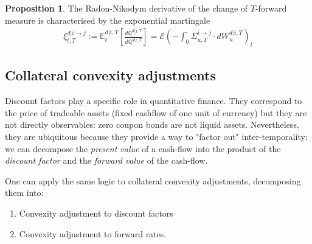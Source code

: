 \documentclass[11pt,english]{amsart}
\newcommand{\EE}{\mathbb{E}}
\newcommand{\QQ}{\mathbb{Q}}
\newcommand{\Q}{\Xi}
\theoremstyle{definition}
\newtheorem{prop}{Proposition}
\begin{document}
 
\begin{prop}
The Radon-Nikodym derivative of the change of $T$-forward measure is characterised by the exponential martingale 
\begin{eqnarray}
  \xi^{d|i\to j}_{t,T}  := \EE^{d|i,T}_t\left[ \frac{d\QQ^{d|j,T}}{d\QQ^{d|i,T}} \right] 
  = \mathcal{E}\left( - \int_0^\cdot \Sigma^{i\to j}_{u,T} \cdot dW^{d|i,T}_u \right)_t
  \label{eq:collateral_radon_nikodym}
\end{eqnarray}
\end{prop}



%

\subsection{Collateral convexity adjustments}
Discount factors play a specific role in quantitative finance. They correspond to the price of tradeable assets (fixed cashflow of one unit of currency) but they are not directly observables: zero coupon bonds are not liquid assets. Nevertheless, they are ubiquitous because they provide a way to "factor out" inter-temporality: we can decompose the \emph{present value} of a cash-flow into the product of the \emph{discount factor} and the \emph{forward value} of the cash-flow. 

One can apply the same logic to collateral convexity adjustments, decomposing them into:
\begin{enumerate}
\item Convexity adjustment to discount factors
\item Convexity adjustment to forward rates.
\end{enumerate} 
\end{document}
